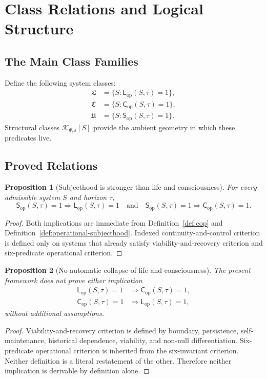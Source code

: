 \documentclass[11pt,a4paper]{article}
\newtheorem{proposition}{Proposition}[section]
\theoremstyle{definition}
\newcommand{\Cop}{\mathsf{C}_{\mathrm{op}}}
\newcommand{\Lop}{\mathsf{L}_{\mathrm{op}}}
\newcommand{\Subop}{\mathsf{S}_{\mathrm{op}}}
\newcommand{\LifeStructClass}{\mathscr{K}}
\newcommand{\PsiVec}{\Psi}
\newcommand{\eps}{\varepsilon}
\newcommand{\LifeClass}{\mathfrak{L}}
\newcommand{\ConClass}{\mathfrak{C}}
\newcommand{\SubClass}{\mathfrak{U}}
\begin{document}
\section{Class Relations and Logical Structure}
\subsection{The Main Class Families}
Define the following system classes:
\[
\begin{aligned}
\LifeClass &= \{S : \Lop(S,\tau)=1\},\\
\ConClass &= \{S : \Cop(S,\tau)=1\},\\
\SubClass &= \{S : \Subop(S,\tau)=1\}.
\end{aligned}
\]
Structural classes $\LifeStructClass_{\PsiVec,\eps}[S]$ provide the ambient geometry in which these predicates live.

\subsection{Proved Relations}
\begin{proposition}[Subjecthood is stronger than life and consciousness]
For every admissible system $S$ and horizon $\tau$,
\[
\Subop(S,\tau)=1 \Longrightarrow \Lop(S,\tau)=1
\quad\text{and}\quad
\Subop(S,\tau)=1 \Longrightarrow \Cop(S,\tau)=1.
\]
\end{proposition}

\begin{proof}
Both implications are immediate from Definition~\ref{def:cop} and Definition~\ref{def:operational-subjecthood}. Indexed continuity-and-control criterion is defined only on systems that already satisfy viability-and-recovery criterion and six-predicate operational criterion.
\end{proof}

\begin{proposition}[No automatic collapse of life and consciousness]
The present framework does not prove either implication
\[
\begin{aligned}
\Lop(S,\tau)=1 &\Longrightarrow \Cop(S,\tau)=1,\\
\Cop(S,\tau)=1 &\Longrightarrow \Lop(S,\tau)=1,
\end{aligned}
\]
without additional assumptions.
\end{proposition}

\begin{proof}
Viability-and-recovery criterion is defined by boundary, persistence, self-maintenance, historical dependence, viability, and non-null differentiation. Six-predicate operational criterion is inherited from the six-invariant criterion. Neither definition is a literal restatement of the other. Therefore neither implication is derivable by definition alone.
\end{proof}
\end{document}
